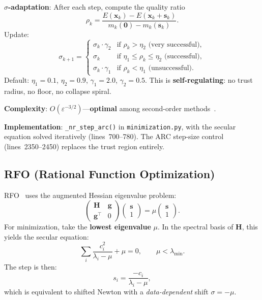 \documentclass[11pt,a4paper]{article}
\newcommand{\vect}[1]{\bm{#1}}
\newcommand{\mat}[1]{\mathbf{#1}}
\theoremstyle{definition}
\begin{document}
\textbf{$\sigma$-adaptation}: After each step, compute the quality ratio
\begin{equation}
  \rho_k = \frac{E(\vect{x}_k) - E(\vect{x}_k + \vect{s}_k)}{m_k(\vect{0}) - m_k(\vect{s}_k)}.
\end{equation}
Update:
\begin{equation}
  \sigma_{k+1} = \begin{cases}
    \sigma_k \cdot \gamma_2 & \text{if } \rho_k > \eta_2 \text{ (very successful)},\\
    \sigma_k & \text{if } \eta_1 \leq \rho_k \leq \eta_2 \text{ (successful)},\\
    \sigma_k \cdot \gamma_1 & \text{if } \rho_k < \eta_1 \text{ (unsuccessful)}.
  \end{cases}
\end{equation}
Default: $\eta_1=0.1$, $\eta_2=0.9$, $\gamma_1=2.0$, $\gamma_2=0.5$.
This is \textbf{self-regulating}: no trust radius, no floor, no collapse
spiral.

\textbf{Complexity}: $O(\varepsilon^{-3/2})$---\textbf{optimal} among
second-order methods~\citep{cgt-optimal}.

\textbf{Implementation}: \texttt{\_nr\_step\_arc()} in
\texttt{minimization.py}, with the secular equation solved iteratively
(lines~700--780).  The ARC step-size control (lines~2350--2450) replaces the
trust region entirely.

\subsection{RFO (Rational Function Optimization)}
\label{sec:rfo}

RFO~\citep{schlegel2011} uses the augmented Hessian eigenvalue problem:
\begin{equation}
  \begin{pmatrix} \mat{H} & \vect{g} \\ \vect{g}^\top & 0 \end{pmatrix}
  \begin{pmatrix} \vect{s} \\ 1 \end{pmatrix}
  = \mu \begin{pmatrix} \vect{s} \\ 1 \end{pmatrix}.
  \label{eq:rfo-augmented}
\end{equation}
For minimization, take the \textbf{lowest eigenvalue} $\mu$.  In the spectral
basis of $\mat{H}$, this yields the secular equation:
\begin{equation}
  \sum_i \frac{c_i^2}{\lambda_i - \mu} + \mu = 0,
  \qquad \mu < \lambda_\text{min}.
  \label{eq:rfo-secular}
\end{equation}
The step is then:
\begin{equation}
  s_i = \frac{-c_i}{\lambda_i - \mu},
  \label{eq:rfo-step}
\end{equation}
which is equivalent to shifted Newton with a \emph{data-dependent} shift
$\sigma = -\mu$.
\end{document}
